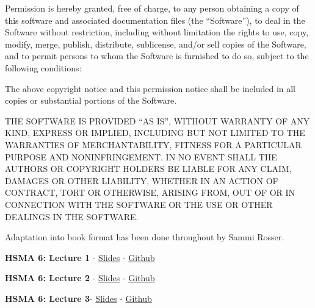 \documentclass[
  letterpaper,
  DIV=11,
  numbers=noendperiod]{scrreprt}
\begin{document}
\begin{tcolorbox}[enhanced jigsaw, rightrule=.15mm, colback=white, colframe=quarto-callout-note-color-frame, colbacktitle=quarto-callout-note-color!10!white, toprule=.15mm, coltitle=black, opacityback=0, titlerule=0mm, bottomtitle=1mm, breakable, title=\textcolor{quarto-callout-note-color}{\faInfo}\hspace{0.5em}{MIT Licence of adapted code}, opacitybacktitle=0.6, toptitle=1mm, arc=.35mm, bottomrule=.15mm, leftrule=.75mm, left=2mm]

Permission is hereby granted, free of charge, to any person obtaining a
copy of this software and associated documentation files (the
``Software''), to deal in the Software without restriction, including
without limitation the rights to use, copy, modify, merge, publish,
distribute, sublicense, and/or sell copies of the Software, and to
permit persons to whom the Software is furnished to do so, subject to
the following conditions:

The above copyright notice and this permission notice shall be included
in all copies or substantial portions of the Software.

THE SOFTWARE IS PROVIDED ``AS IS'', WITHOUT WARRANTY OF ANY KIND,
EXPRESS OR IMPLIED, INCLUDING BUT NOT LIMITED TO THE WARRANTIES OF
MERCHANTABILITY, FITNESS FOR A PARTICULAR PURPOSE AND NONINFRINGEMENT.
IN NO EVENT SHALL THE AUTHORS OR COPYRIGHT HOLDERS BE LIABLE FOR ANY
CLAIM, DAMAGES OR OTHER LIABILITY, WHETHER IN AN ACTION OF CONTRACT,
TORT OR OTHERWISE, ARISING FROM, OUT OF OR IN CONNECTION WITH THE
SOFTWARE OR THE USE OR OTHER DEALINGS IN THE SOFTWARE.

\end{tcolorbox}

Adaptation into book format has been done throughout by Sammi Rosser.

\textbf{HSMA 6: Lecture 1} -
\href{https://docs.google.com/presentation/d/1HO0wXTocHRZgeuLadkGvqf5yC8BEmQzTcgo8QHOd0yY/edit?usp=sharing}{Slides}
- \href{https://github.com/hsma-programme/h6_2a_intro_to_des}{Github}

\textbf{HSMA 6: Lecture 2} -
\href{https://docs.google.com/presentation/d/15bQX0yxfDgjNVJSQORNzBCWVvbKI_LaTcbtYVKsvYcU/edit?usp=sharing}{Slides}
- \href{https://github.com/hsma-programme/h6_simpy_part_1}{Github}

\textbf{HSMA 6: Lecture 3}-
\href{https://docs.google.com/presentation/d/1y7S7bjJtdLQCquzzZ2vjYzRx9-RwXE-SWgWf88fLc4o/edit?usp=sharing}{Slides}
- \href{https://github.com/hsma-programme/h6_simpy_part_2}{Github}
\end{document}
